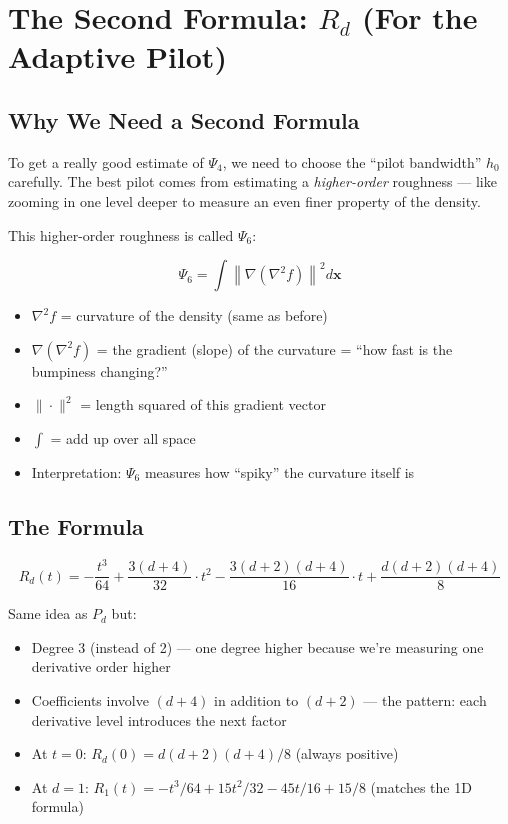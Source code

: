 \documentclass[12pt]{article}
\newcommand{\step}[1]{\begin{tcolorbox}[colback=blue!5,colframe=blue!50!black,title=Step-by-Step]\small #1\end{tcolorbox}}
\begin{document}
\section{The Second Formula: $R_d$ (For the Adaptive Pilot)}

\subsection{Why We Need a Second Formula}

To get a really good estimate of $\Psi_4$, we need to choose the ``pilot bandwidth'' $h_0$ carefully. The best pilot comes from estimating a \emph{higher-order} roughness --- like zooming in one level deeper to measure an even finer property of the density.

This higher-order roughness is called $\Psi_6$:

$$\Psi_6 = \int \left\|\nabla(\nabla^2 f)\right\|^2 d\mathbf{x}$$

\step{
\begin{itemize}
\item $\nabla^2 f$ = curvature of the density (same as before)
\item $\nabla(\nabla^2 f)$ = the gradient (slope) of the curvature = ``how fast is the bumpiness changing?''
\item $\|\cdot\|^2$ = length squared of this gradient vector
\item $\int$ = add up over all space
\item Interpretation: $\Psi_6$ measures how ``spiky'' the curvature itself is
\end{itemize}
}

\subsection{The Formula}

$$R_d(t) = -\frac{t^3}{64} + \frac{3(d+4)}{32} \cdot t^2 - \frac{3(d+2)(d+4)}{16} \cdot t + \frac{d(d+2)(d+4)}{8}$$

\step{
Same idea as $P_d$ but:
\begin{itemize}
\item Degree 3 (instead of 2) --- one degree higher because we're measuring one derivative order higher
\item Coefficients involve $(d+4)$ in addition to $(d+2)$ --- the pattern: each derivative level introduces the next factor
\item At $t=0$: $R_d(0) = d(d+2)(d+4)/8$ (always positive)
\item At $d=1$: $R_1(t) = -t^3/64 + 15t^2/32 - 45t/16 + 15/8$ (matches the 1D formula)
\end{itemize}
}
\end{document}
